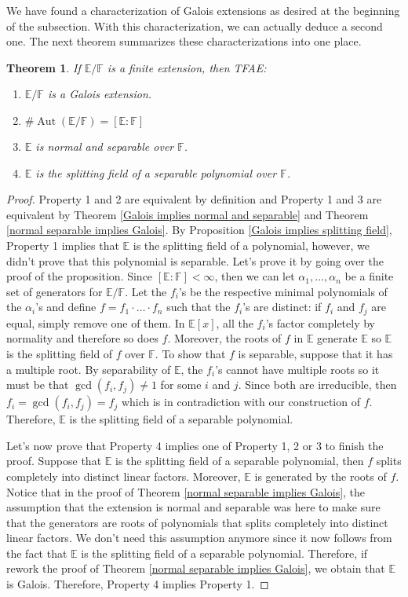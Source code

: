 \documentclass{article}
\theoremstyle{plain}
\newtheorem{theorem}{Theorem}[subsection]
\theoremstyle{definition}
\newcommand{\F}{\mathbb{F}}
\newcommand{\E}{\mathbb{E}}
\DeclareMathOperator{\Aut}{Aut}
\begin{document}
We have found a characterization of Galois extensions as desired at the beginning of the subsection. With this characterization, we can actually deduce a second one. The next theorem summarizes these characterizations into one place.

\begin{theorem}
\label{theorem characterizations of Galois}
    If $\E / \F$ is a finite extension, then TFAE:
    \begin{enumerate}
        \item $\E / \F$ is a Galois extension.
        \item $\# \Aut(\E / \F) = [\E : \F]$
        \item $\E$ is normal and separable over $\F$.
        \item $\E$ is the splitting field of a separable polynomial over $\F$.
    \end{enumerate}
\end{theorem}

\begin{proof}
    Property 1 and 2 are equivalent by definition and Property 1 and 3 are equivalent by Theorem \ref{Galois implies normal and separable} and Theorem \ref{normal separable implies Galois}. By Proposition \ref{Galois implies splitting field}, Property 1 implies that $\E$ is the splitting field of a polynomial, however, we didn't prove that this polynomial is separable. Let's prove it by going over the proof of the proposition. Since $[\E : \F] < \infty$, then we can let $\alpha_1, ..., \alpha_n$ be a finite set of generators for $\E / \F$. Let the $f_i$'s be the respective minimal polynomials of the $\alpha_i$'s and define $f = f_1 \cdot \dots \cdot f_n$ such that the $f_i$'s are distinct: if $f_i$ and $f_j$ are equal, simply remove one of them. In $\E[x]$, all the $f_i$'s factor completely by normality and therefore so does $f$. Moreover, the roots of $f$ in $\E$ generate $\E$ so $\E$ is the splitting field of $f$ over $\F$. To show that $f$ is separable, suppose that it has a multiple root. By separability of $\E$, the $f_i$'s cannot have multiple roots so it must be that $\gcd(f_i, f_j) \neq 1$ for some $i$ and $j$. Since both are irreducible, then $f_i = \gcd(f_i, f_j) = f_j$ which is in contradiction with our construction of $f$. Therefore, $\E$ is the splitting field of a separable polynomial.
    
    Let's now prove that Property 4 implies one of Property 1, 2 or 3 to finish the proof. Suppose that $\E$ is the splitting field of a separable polynomial, then $f$ splits completely into distinct linear factors. Moreover, $\E$ is generated by the roots of $f$. Notice that in the proof of Theorem \ref{normal separable implies Galois}, the assumption that the extension is normal and separable was here to make sure that the generators are roots of polynomials that splits completely into distinct linear factors. We don't need this assumption anymore since it now follows from the fact that $\E$ is the splitting field of a separable polynomial. Therefore, if rework the proof of Theorem \ref{normal separable implies Galois}, we obtain that $\E$ is Galois. Therefore, Property 4 implies Property 1.
\end{proof}
\end{document}
